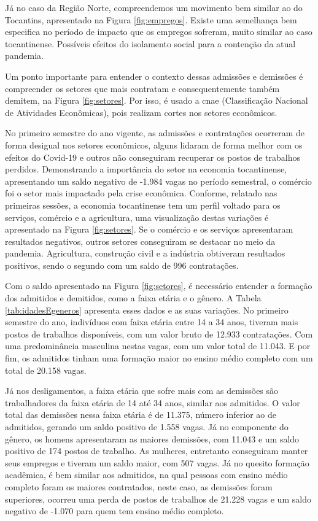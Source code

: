 \par Já no caso da Região Norte, compreendemos um movimento bem similar ao do Tocantins, apresentado na Figura \ref{fig:empregos}. Existe uma semelhança bem especifica no período de impacto que os empregos sofreram, muito similar ao caso tocantinense. Possíveis efeitos do isolamento social para a contenção da atual pandemia.

\par Um ponto importante para entender o contexto dessas admissões e demissões é compreender os setores que mais contratam e consequentemente também demitem, na Figura \ref{fig:setores}. Por isso, é usado a \acrshort{cnae} (Classificação Nacional de Atividades Econômicas), pois realizam cortes nos setores econômicos.

\par No primeiro semestre do ano vigente, as admissões e contratações ocorreram de forma desigual nos setores econômicos, alguns lidaram de forma melhor com os efeitos do Covid-19 e outros não conseguiram recuperar os postos de trabalhos perdidos. Demonstrando a importância do setor na economia tocantinense, apresentando um saldo negativo de -1.984 vagas no período semestral, o comércio foi o setor mais impactado pela crise econômica. Conforme, relatado nas primeiras sessões, a economia tocantinense tem um perfil voltado para os serviços, comércio e a agricultura, uma visualização destas variações é apresentado na Figura \ref{fig:setores}. Se o comércio e os serviços apresentaram resultados negativos, outros setores conseguiram se destacar no meio da pandemia. Agricultura, construção civil e a indústria obtiveram resultados positivos, sendo o segundo com um saldo de 996 contratações.


\par Com o saldo apresentado na Figura \ref{fig:setores}, é necessário entender a formação dos admitidos e demitidos, como a faixa etária e o gênero. A Tabela \ref{tab:idadesEgeneros} apresenta esses dados e as suas variações. No primeiro semestre do ano, indivíduos com faixa etária entre 14 a 34 anos, tiveram mais postos de trabalhos disponíveis, com um valor bruto de 12.933 contratações. Com uma predominância masculina nestas vagas, com um valor total de 11.043. E por fim, os admitidos tinham uma formação maior no ensino médio completo com um total de 20.158 vagas.

\par Já nos desligamentos, a faixa etária que sofre mais com as demissões são trabalhadores da faixa etária de 14 até 34 anos, similar aos admitidos. O valor total das demissões nessa faixa etária é de 11.375, número inferior ao de admitidos, gerando um saldo positivo de 1.558 vagas. Já no componente do gênero, os homens apresentaram as maiores demissões, com 11.043 e um saldo positivo de 174 postos de trabalho. As mulheres, entretanto conseguiram manter seus empregos e tiveram um saldo maior, com 507 vagas. Já no quesito formação acadêmica, é bem similar aos admitidos, na qual pessoas com ensino médio completo foram os maiores contratados, neste caso, as demissões foram superiores, ocorreu uma perda de postos de trabalhos de 21.228 vagas e um saldo negativo de -1.070 para quem tem ensino médio completo. 


